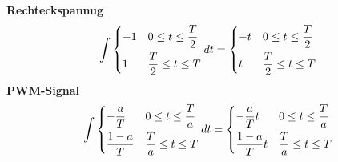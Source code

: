 \textbf{Rechteckspannug}
\begin{equation}
  \int \begin{dcases}
   -1 & 0 \leq t \leq \frac{T}{2}\\
    1 & \frac{T}{2}\leq t \leq T
 \end{dcases}
 dt = \begin{dcases}
    -t &  0 \leq t \leq \frac{T}{2}\\
     t & \frac{T}{2}\leq t \leq  T
   \end{dcases}
\end{equation}
\textbf{PWM-Signal}
\begin{equation}
  \int \begin{dcases}
   -\frac{a}{T} & 0 \leq t \leq \frac{T}{a}\\
    \frac{1-a}{T} & \frac{T}{a}\leq t \leq T
 \end{dcases}
 dt = \begin{dcases}
    -\frac{a}{T}t &  0 \leq t \leq \frac{T}{a}\\
     \frac{1-a}{T}t & \frac{T}{a}\leq t \leq  T
   \end{dcases}
\end{equation}
